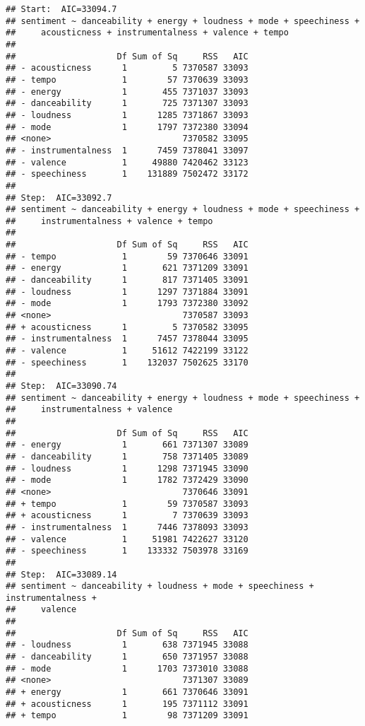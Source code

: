 \documentclass[]{article}
\begin{document}
\begin{verbatim}
## Start:  AIC=33094.7
## sentiment ~ danceability + energy + loudness + mode + speechiness + 
##     acousticness + instrumentalness + valence + tempo
## 
##                    Df Sum of Sq     RSS   AIC
## - acousticness      1         5 7370587 33093
## - tempo             1        57 7370639 33093
## - energy            1       455 7371037 33093
## - danceability      1       725 7371307 33093
## - loudness          1      1285 7371867 33093
## - mode              1      1797 7372380 33094
## <none>                          7370582 33095
## - instrumentalness  1      7459 7378041 33097
## - valence           1     49880 7420462 33123
## - speechiness       1    131889 7502472 33172
## 
## Step:  AIC=33092.7
## sentiment ~ danceability + energy + loudness + mode + speechiness + 
##     instrumentalness + valence + tempo
## 
##                    Df Sum of Sq     RSS   AIC
## - tempo             1        59 7370646 33091
## - energy            1       621 7371209 33091
## - danceability      1       817 7371405 33091
## - loudness          1      1297 7371884 33091
## - mode              1      1793 7372380 33092
## <none>                          7370587 33093
## + acousticness      1         5 7370582 33095
## - instrumentalness  1      7457 7378044 33095
## - valence           1     51612 7422199 33122
## - speechiness       1    132037 7502625 33170
## 
## Step:  AIC=33090.74
## sentiment ~ danceability + energy + loudness + mode + speechiness + 
##     instrumentalness + valence
## 
##                    Df Sum of Sq     RSS   AIC
## - energy            1       661 7371307 33089
## - danceability      1       758 7371405 33089
## - loudness          1      1298 7371945 33090
## - mode              1      1782 7372429 33090
## <none>                          7370646 33091
## + tempo             1        59 7370587 33093
## + acousticness      1         7 7370639 33093
## - instrumentalness  1      7446 7378093 33093
## - valence           1     51981 7422627 33120
## - speechiness       1    133332 7503978 33169
## 
## Step:  AIC=33089.14
## sentiment ~ danceability + loudness + mode + speechiness + instrumentalness + 
##     valence
## 
##                    Df Sum of Sq     RSS   AIC
## - loudness          1       638 7371945 33088
## - danceability      1       650 7371957 33088
## - mode              1      1703 7373010 33088
## <none>                          7371307 33089
## + energy            1       661 7370646 33091
## + acousticness      1       195 7371112 33091
## + tempo             1        98 7371209 33091

\end{verbatim}
\end{document}
